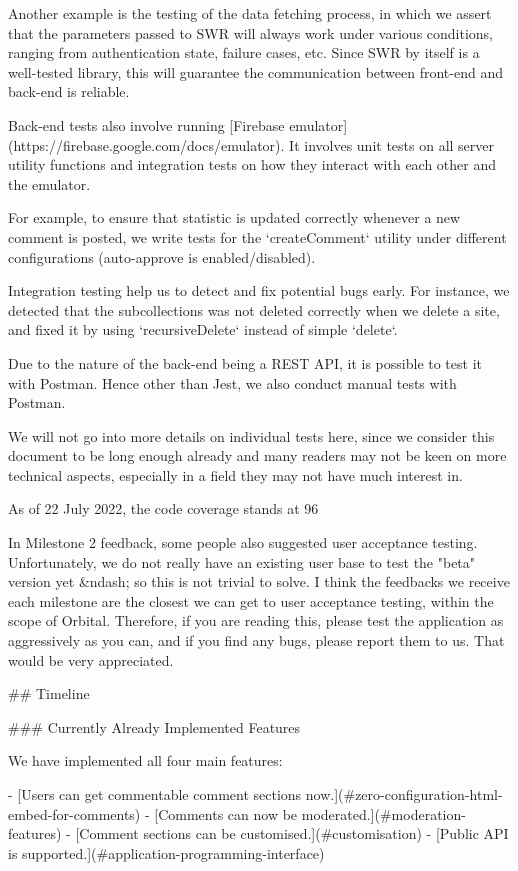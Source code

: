 \documentclass[11pt]{article}
\begin{document}
\begin{markdown}
Another example is the testing of the data fetching process, in which we assert that the parameters passed to SWR will always work under various conditions, ranging from authentication state, failure cases, etc. Since SWR by itself is a well-tested library, this will guarantee the communication between front-end and back-end is reliable.

Back-end tests also involve running [Firebase emulator](https://firebase.google.com/docs/emulator). It involves unit tests on all server utility functions and integration tests on how they interact with each other and the emulator.

For example, to ensure that statistic is updated correctly whenever a new comment is posted, we write tests for the `createComment` utility under different configurations (auto-approve is enabled/disabled).

Integration testing help us to detect and fix potential bugs early. For instance, we detected that the subcollections was not deleted correctly when we delete a site, and fixed it by using `recursiveDelete` instead of simple `delete`.

Due to the nature of the back-end being a REST API, it is possible to test it with Postman. Hence other than Jest, we also conduct manual tests with Postman.

We will not go into more details on individual tests here, since we consider this document to be long enough already and many readers may not be keen on more technical aspects, especially in a field they may not have much interest in.

As of 22 July 2022, the code coverage stands at 96%

In Milestone 2 feedback, some people also suggested user acceptance testing. Unfortunately, we do not really have an existing user base to test the "beta" version yet &ndash; so this is not trivial to solve. I think the feedbacks we receive each milestone are the closest we can get to user acceptance testing, within the scope of Orbital. Therefore, if you are reading this, please test the application as aggressively as you can, and if you find any bugs, please report them to us. That would be very appreciated.

## Timeline

### Currently Already Implemented Features

We have implemented all four main features:

- [Users can get commentable comment sections now.](#zero-configuration-html-embed-for-comments)
- [Comments can now be moderated.](#moderation-features)
- [Comment sections can be customised.](#customisation)
- [Public API is supported.](#application-programming-interface)


\end{markdown}
\end{document}
